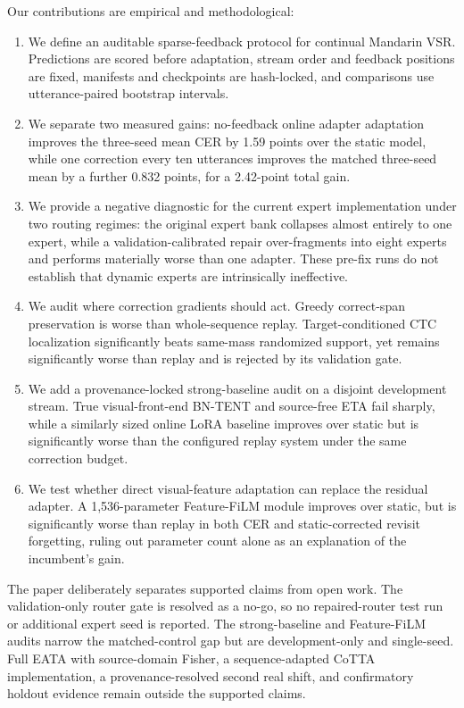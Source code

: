 Our contributions are empirical and methodological:
\begin{enumerate}
  \item We define an auditable sparse-feedback protocol for continual Mandarin VSR. Predictions are scored before adaptation, stream order and feedback positions are fixed, manifests and checkpoints are hash-locked, and comparisons use utterance-paired bootstrap intervals.
  \item We separate two measured gains: no-feedback online adapter adaptation improves the three-seed mean CER by 1.59 points over the static model, while one correction every ten utterances improves the matched three-seed mean by a further 0.832 points, for a 2.42-point total gain.
  \item We provide a negative diagnostic for the current expert implementation under two routing regimes: the original expert bank collapses almost entirely to one expert, while a validation-calibrated repair over-fragments into eight experts and performs materially worse than one adapter. These pre-fix runs do not establish that dynamic experts are intrinsically ineffective.
  \item We audit where correction gradients should act. Greedy correct-span preservation is worse than whole-sequence replay. Target-conditioned CTC localization significantly beats same-mass randomized support, yet remains significantly worse than replay and is rejected by its validation gate.
  \item We add a provenance-locked strong-baseline audit on a disjoint development stream. True visual-front-end BN-TENT and source-free ETA fail sharply, while a similarly sized online LoRA baseline improves over static but is significantly worse than the configured replay system under the same correction budget.
  \item We test whether direct visual-feature adaptation can replace the residual adapter. A 1,536-parameter Feature-FiLM module improves over static, but is significantly worse than replay in both CER and static-corrected revisit forgetting, ruling out parameter count alone as an explanation of the incumbent's gain.
\end{enumerate}

The paper deliberately separates supported claims from open work. The validation-only router gate is resolved as a no-go, so no repaired-router test run or additional expert seed is reported. The strong-baseline and Feature-FiLM audits narrow the matched-control gap but are development-only and single-seed. Full EATA with source-domain Fisher, a sequence-adapted CoTTA implementation, a provenance-resolved second real shift, and confirmatory holdout evidence remain outside the supported claims.
